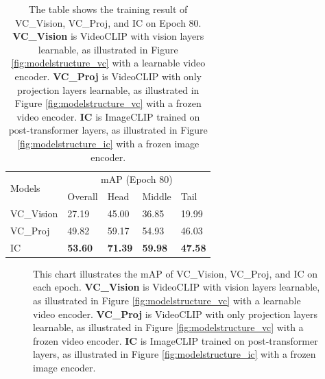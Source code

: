 \begin{table}[ht]
    \centering
    \caption[Training Results for Visual Encoder Selection on Epoch 80]{The table shows the training result of VC\_Vision, VC\_Proj, and IC on Epoch 80. \textbf{VC\_Vision} is VideoCLIP with vision layers learnable, as illustrated in Figure \ref{fig:modelstructure_vc} with a learnable video encoder. \textbf{VC\_Proj} is VideoCLIP with only projection layers learnable, as illustrated in Figure \ref{fig:modelstructure_vc} with a frozen video encoder. \textbf{IC} is ImageCLIP trained on post-transformer layers, as illustrated in Figure \ref{fig:modelstructure_ic} with a frozen image encoder.}
    \label{tab:resultsbackbone}
    \begin{tabular}{lllll}
        \toprule
        \multirow{2}{*}{Models} & \multicolumn{4}{c}{mAP (Epoch 80)} \\
        \cmidrule{2-5} 
        {} & Overall & Head  & Middle & Tail \\
        \midrule
        VC\_Vision  & 27.19   & 45.00 & 36.85 & 19.99 \\
        VC\_Proj    & 49.82   & 59.17 & 54.93 & 46.03 \\
        IC          & \textbf{53.60} & \textbf{71.39} & \textbf{59.98} & \textbf{47.58} \\
        \bottomrule
    \end{tabular}
\end{table}

\begin{figure}[ht]
    \centering
    \resizebox{1.0\textwidth}{!}{}
    \caption[mAP of VC\_Vision, VC\_Proj, and IC on each Epoch]{This chart illustrates the mAP of VC\_Vision, VC\_Proj, and IC on each epoch. \textbf{VC\_Vision} is VideoCLIP with vision layers learnable, as illustrated in Figure \ref{fig:modelstructure_vc} with a learnable video encoder. \textbf{VC\_Proj} is VideoCLIP with only projection layers learnable, as illustrated in Figure \ref{fig:modelstructure_vc} with a frozen video encoder. \textbf{IC} is ImageCLIP trained on post-transformer layers, as illustrated in Figure \ref{fig:modelstructure_ic} with a frozen image encoder.}
    \label{fig:tp_backbone}
\end{figure}

